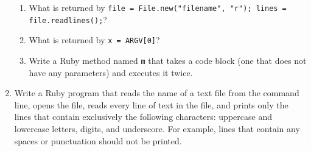 \documentclass[11pt]{article}
\begin{document}
\begin{enumerate}
\begin{enumerate}
            \item What is returned by \texttt{file = File.new("filename",
                  "r"); lines = file.readlines();}?

            \item What is returned by \texttt{x = ARGV[0]}?

            \item Write a Ruby method named \texttt{m} that takes a code
                  block (one that does not have any parameters) and executes
                  it twice.

          \end{enumerate}

    \item Write a Ruby program that reads the name of a text file from the
          command line, opens the file, reads every line of text in the
          file, and prints only the lines that contain exclusively the
          following characters: uppercase and lowercase letters, digits, and
          underscore.  For example, lines that contain any spaces or
          punctuation should not be printed.


  \end{enumerate}
\end{document}
